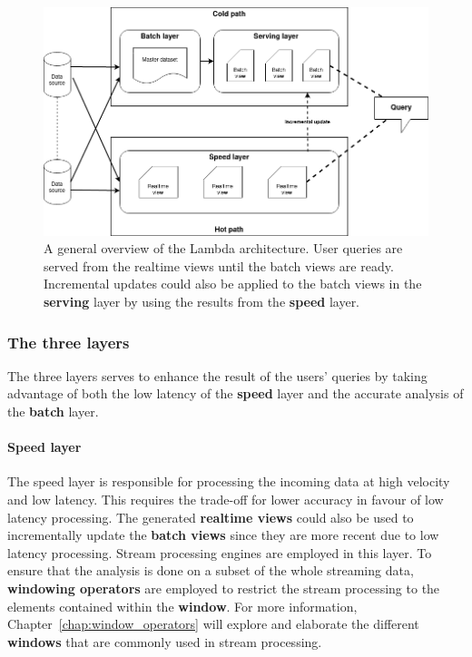 \begin{figure}[!htpb]
    \centering
    \includegraphics[width=\linewidth]{fig/lambda_arch.png}
    \caption{A general overview of the Lambda architecture. User queries are served from 
    the realtime views until the batch views are ready. Incremental updates could also be applied 
to the batch views in the \textbf{serving} layer by using the results from the \textbf{speed} layer.
~\cite{lambda_arch_book}}%
    \label{fig:lambda_arch}
\end{figure}

\subsubsection{The three layers}
The three layers serves to enhance the result of the users' queries by taking 
advantage of both the low latency of the \textbf{speed} layer and the accurate analysis of the \textbf{batch}
layer. 

\paragraph{Speed layer}%
\label{par:Speed layer}
The speed layer is responsible for processing the incoming data at high velocity and low latency. 
This requires the trade-off for lower accuracy in favour of low latency processing. The generated 
\textbf{realtime views}  could also be used to incrementally update the \textbf{batch views} since they 
are more recent due to low latency processing. Stream processing engines are employed in this 
layer. To ensure that the 
analysis is done on a subset of the whole streaming data, \textbf{windowing operators} are employed 
to restrict the stream processing to the elements contained within the \textbf{window}. For more information,
Chapter~\ref{chap:window_operators} will explore and elaborate the different \textbf{windows} that 
are commonly used in stream processing. 


